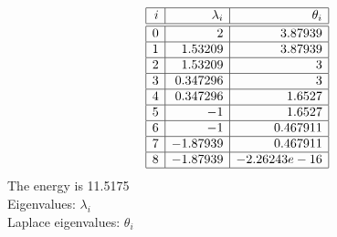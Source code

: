 $$
\begin{array}{|r|r|r|}
\hline
 i  & \lambda_i & \theta_i \\
\hline
\hline
0 & 2 & 3.87939\\
\hline
1 & 1.53209 & 3.87939\\
\hline
2 & 1.53209 & 3\\
\hline
3 & 0.347296 & 3\\
\hline
4 & 0.347296 & 1.6527\\
\hline
5 & -1 & 1.6527\\
\hline
6 & -1 & 0.467911\\
\hline
7 & -1.87939 & 0.467911\\
\hline
8 & -1.87939 & -2.26243e-16\\
\hline
\end{array}
$$
The energy is 11.5175\\
Eigenvalues: $\lambda_i$\\
Laplace eigenvalues: $\theta_i$\\
